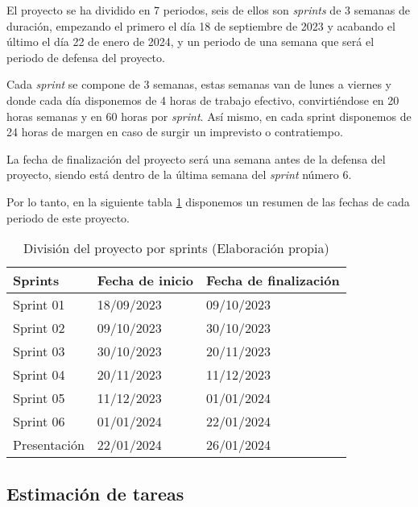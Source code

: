 El proyecto se ha dividido en 7 periodos, seis de ellos son \textit{sprints} de 3 semanas de duración, empezando el primero el día 18 de septiembre de 2023 y acabando el último
el día 22 de enero de 2024, y un periodo de una semana que será el periodo de defensa del proyecto.

Cada \textit{sprint} se compone de 3 semanas, estas semanas van de lunes a viernes y donde cada día disponemos de 4 horas de trabajo efectivo, convirtiéndose en 20 horas semanas
y en 60 horas por \textit{sprint}. Así mismo, en cada sprint disponemos de 24 horas de margen en caso de surgir un imprevisto o contratiempo.

La fecha de finalización del proyecto será una semana antes de la defensa del proyecto, siendo está dentro de la última semana del \textit{sprint} número 6.

Por lo tanto, en la siguiente tabla \ref{tab:proyecto_estimacion} disponemos un resumen de las fechas de cada periodo de este proyecto.

\begin{table}[H]
    \centering
    \begin{tabular}{|l|l|l|}
    \hline
    \rowcolor[HTML]{8EA9D8} 
    Sprints      & Fecha de inicio & Fecha de finalización \\ \hline
    Sprint 01    & 18/09/2023      & 09/10/2023            \\ \hline
    Sprint 02    & 09/10/2023      & 30/10/2023            \\ \hline
    Sprint 03    & 30/10/2023      & 20/11/2023            \\ \hline
    Sprint 04    & 20/11/2023      & 11/12/2023            \\ \hline
    Sprint 05    & 11/12/2023      & 01/01/2024            \\ \hline
    Sprint 06    & 01/01/2024      & 22/01/2024            \\ \hline
    Presentación & 22/01/2024      & 26/01/2024            \\ \hline
    \end{tabular}
    \caption[División del proyecto por sprints]{División del proyecto por sprints (Elaboración propia)}
    \label{tab:proyecto_estimacion}
\end{table}

\subsection{Estimación de tareas}
\label{sec:estimacion_tareas}

